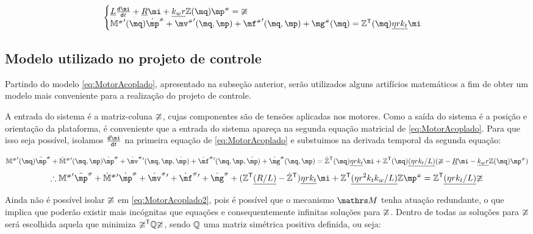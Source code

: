\documentclass[a4paper,11pt,brazil,fleqn]{article}
\begin{document}
\begin{equation} \label{eq:MotorAcoplado}
\begin{cases}
\underline{L} \frac{\dd \mi}{\dd t} + \underline{R} \mi + \underline{k_w r} \mZ (\mq) \mp\ssh = \mup
\\
{\mM\ssh}'(\mq) \dot{\mp}\ssh + {\mv\ssh}'(\mq,\mp) + {\mf\ssh}'(\mq,\mp) + {\mg\ssh}(\mq) = \mZ^\msT (\mq) \underline{\eta r k_t} \mi
\end{cases}
\end{equation}

\subsection{Modelo utilizado no projeto de controle}\label{S04-5}

Partindo do modelo \eqref{eq:MotorAcoplado}, apresentado na subse\c{c}\~ao anterior, ser\~ao utilizados alguns artif\'icios matem\'aticos a fim de obter um modelo mais conveniente para a realiza\c{c}\~ao do projeto de controle.

A entrada do sistema \'e a matriz-coluna $\mathbb{\upsilon}$, cujas componentes s\~ao de tens\~oes aplicadas nos motores. Como a sa\'ida do sistema \'e a posi\c{c}\~ao e orienta\c{c}\~ao da plataforma, \'e conveniente que a entrada do sistema apare\c{c}a na segunda equa\c{c}\~ao matricial de \eqref{eq:MotorAcoplado}. Para que isso seja poss\'ivel, isolamos $\frac{\dd \mi}{\dd t}$ na primeira equa\c{c}\~ao de \eqref{eq:MotorAcoplado} e substuimos na derivada temporal da segunda equa\c{c}\~ao:

$$
{\mM\ssh}'(\mq) \ddot{\mp}\ssh + {{\dot{\mM}}\ssh}{'} (\mq,\mp) \dot{\mp}\ssh + {\dot{\mv}\ssh}{'}(\mq,\mp,\dot{\mp}) + {\dot{\mf}\ssh}{'}(\mq,\mp,\dot{\mp}) + {\dot{\mg}\ssh}(\mq,\mp) = \dot{\mZ}^\msT (\mq) \underline{\eta r k_t} \mi + \mZ^\msT (\mq) \underline{(\eta r k_t / L)} ( \mup -  \underline{R} \mi - \underline{k_w r} \mZ (\mq) \mp\ssh )
$$
\begin{equation} \label{eq:MotorAcoplado2}
\therefore {\mM\ssh}' \ddot{\mp}\ssh + {{\dot{\mM}}\ssh}{'} \dot{\mp}\ssh + {\dot{\mv}\ssh}{'} + {\dot{\mf}\ssh}{'} + {\dot{\mg}\ssh} + ( \mZ^\msT  \underline{(R/L)} - \dot{\mZ}^\msT ) \underline{\eta r k_t} \mi + \mZ^\msT  \underline{(\eta r^2 k_t k_w / L)}  \mZ \mp\ssh =  \mZ^\msT  \underline{(\eta r k_t / L)} \mup
\end{equation}

Ainda n\~ao \'e poss\'ivel isolar $\mathbb{\upsilon}$ em \eqref{eq:MotorAcoplado2}, pois \'e poss\'ivel que o mecanismo $\ssM$ tenha atua\c{c}\~ao redundante, o que implica que poder\~ao existir mais inc\'ognitas que equa\c{c}\~oes e consequentemente infinitas solu\c{c}\~oes para $\mathbb{\upsilon}$. Dentro de todas as solu\c{c}\~oes para $\mathbb{\upsilon}$ ser\'a escolhida aquela que minimiza $\mathbb{\upsilon}^{\mathsf{T}} \mathbb{Q} \mathbb{\upsilon}$, sendo $\mathbb{Q}$ uma matriz sim\'etrica positiva definida, ou seja:
\end{document}
